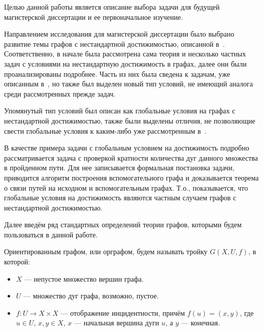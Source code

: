 




	
	\Intro
	
	Целью данной работы является описание выбора задачи для будущей магистерской диссертации и ее
	первоначальное изучение. 
	
	Направлением исследования для магистерской диссертации было выбрано развитие темы графов с нестандартной достижимостью, описанной в~\autocite{Mono}. Соответственно, в начале была рассмотрена сама теория и несколько частных задач с условиями на нестандартную достижимость в графах, далее они были проанализированы подробнее. Часть из них была сведена к задачам, уже описанным в~\autocite{Mono}, но также был выделен новый тип условий, не имеющий аналога среди рассмотренных прежде задач.
	
	Упомянутый тип условий был описан как глобальные условия на графах с нестандартной достижимостью, также были выделены отличия, не позволяющие свести глобальные условия к каким-либо уже рассмотренным в~\autocite{Mono}. 
	
	В качестве примера задачи с глобальным условием на достижимость подробно рассматривается задача с проверкой кратности количества дуг данного множества в пройденном пути. Для нее записывается формальная постановка задачи, приводится алгоритм построения вспомогательного графа и доказывается теорема о связи путей на исходном и вспомогательным графах. Т.о., показывается, что глобальные условия на достижимость являются частным случаем графов с нестандартной достижимостью. 
	
	Далее введём ряд стандартных определений теории графов, которыми будем пользоваться в данной работе. 
	
	\begin{mydefinition}
		Ориентированным графом, или орграфом, будем называть тройку $G(X,U,f)$, в которой:
		\begin{itemize}
			\item $X$ --- непустое множество вершин графа.
			\item $U$ --- множество дуг графа, возможно, пустое.
			\item $f:U\to X \times X$ --- отображение инцидентности, причём $f(u) = (x, y)$, где $u \in U$, $x, y \in X$, $x$ --- начальная вершина дуги $u$, а $y$ --- конечная.
		\end{itemize}
	\end{mydefinition}
	
